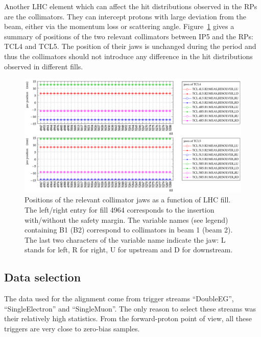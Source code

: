 \documentclass[TOTEM]{cern/cernphprep}
\begin{document}
Another LHC element which can affect the hit distributions observed in the RPs are the collimators. They can intercept protons with large deviation from the beam, either via the momentum loss or scattering angle. Figure~\ref{fig:cond_collimators} gives a summary of positions of the two relevant collimators between IP5 and the RPs: TCL4 and TCL5. The position of their jaws is unchanged during the period and thus the collimators should not introduce any difference in the hit distributions observed in different fills.

\begin{figure}[h!]
\begin{center}
\includegraphics[width=1\hsize]{fig/conditions/collimator_positions_resolver.pdf}
\caption{%
Positions of the relevant collimator jaws as a function of LHC fill. The left/right entry for fill 4964 corresponds to the insertion with/without the safety margin. The variable names (see legend) containing B1 (B2) correspond to collimators in beam 1 (beam 2). The last two characters of the variable name indicate the jaw: L stands for left, R for right, U for upstream and D for downstream.
}
\label{fig:cond_collimators}
\end{center}
\end{figure}




\subsection{Data selection}
\label{s:phys-data_selection}

The data used for the alignment come from trigger streams ``DoubleEG'', ``SingleElectron'' and ``SingleMuon''. The only reason to select these streams was their relatively high statistics. From the forward-proton point of view, all these triggers are very close to zero-bias samples.
\end{document}
